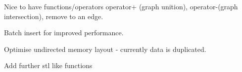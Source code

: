 
\begin{DoxyRefList}
\item[Class \mbox{\hyperlink{classNeoFOAM_1_1deviceAdjacency}{Neo\+FOAM\+::device\+Adjacency$<$ Tlabel, directed $>$}} ]\label{todo__todo000001}%
%
Nice to have functions/operators operator+ (graph unition), operator-\/(graph intersection), remove to an edge. 

Batch insert for improved performance. 

Optimise undirected memory layout -\/ currently data is duplicated. 

Add further \textquotesingle{}stl like functions\textquotesingle{} 
\end{DoxyRefList}
